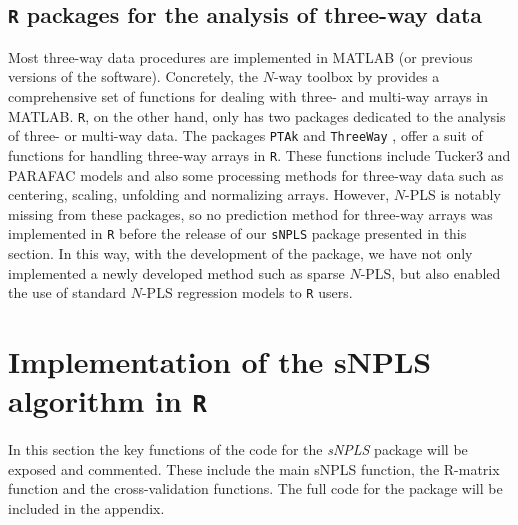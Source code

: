 \subsection{\texttt{R} packages for the analysis of three-way data}
Most three-way data procedures are implemented in MATLAB\textsuperscript{\tiny\textregistered} \textcite{MATLAB:2010} (or previous versions of the software). Concretely, the $N$-way toolbox by \textcite{andersson2000n} provides a comprehensive set of functions for dealing with three- and multi-way arrays in MATLAB\textsuperscript{\tiny\textregistered}. \texttt{R}, on the other hand, only has two packages dedicated to the analysis of three- or multi-way data. The packages \texttt{PTAk} \parencite{leibovici2010spatio} and \texttt{ThreeWay} \parencite{giordani2014three}, offer a suit of functions for handling three-way arrays in \texttt{R}. These functions include Tucker3 and PARAFAC models and also some processing methods for three-way data such as centering, scaling, unfolding and normalizing arrays. However, $N$-PLS is notably missing from these packages, so no prediction method for three-way arrays was implemented in \texttt{R} before the release of our \texttt{sNPLS} package presented in this section. In this way, with the development of the package, we have not only implemented a newly developed method such as sparse $N$-PLS, but also enabled the use of standard $N$-PLS regression models to \texttt{R} users.


\section{Implementation of the sNPLS algorithm in \texttt{R}}
In this section the key functions of the code for the \textit{sNPLS} package will be exposed and commented. These include the main sNPLS function, the R-matrix function and the cross-validation functions. The full code for the package will be included in the appendix.


